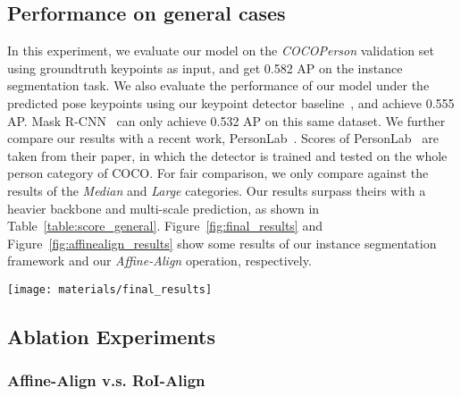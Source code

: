 \documentclass[10pt,twocolumn,letterpaper]{article}
\begin{document}
\subsection{Performance on general cases}
In this experiment, we evaluate our model on the \emph{COCOPerson} validation set using groundtruth keypoints as input, and get 0.582 AP on the instance segmentation task. We also evaluate the performance of our model under the predicted pose keypoints using our keypoint detector baseline~\cite{Newell2016Associative}, and achieve 0.555 AP. Mask R-CNN~\cite{He2017Mask} can only achieve 0.532 AP on this same dataset. We further compare our results with a recent work, PersonLab~\cite{papandreou2018personlab}. Scores of PersonLab~\cite{papandreou2018personlab} are taken from their paper, in which the detector is trained and tested on the whole person category of COCO. For fair comparison, we only compare against the results of the \emph{Median} and \emph{Large} categories. Our results surpass theirs with a heavier backbone and multi-scale prediction, as shown in Table~\ref{table:score_general}. Figure~\ref{fig:final_results} and Figure~\ref{fig:affinealign_results} show some results of our instance segmentation framework and our \emph{Affine-Align} operation, respectively.


\begin{figure*}[t]
\setlength{\abovecaptionskip}{0.1cm}
\setlength{\belowcaptionskip}{-0.5cm}
\centering
\texttt{[image: materials/final\_results]}
\caption{More results of our instance segmentation framework on COCO. Bounding-boxes are generated using predicted masks for better visualization.}
\label{fig:final_results}
\end{figure*}

\subsection{Ablation Experiments}

\subsubsection{Affine-Align v.s. RoI-Align}
\end{document}
